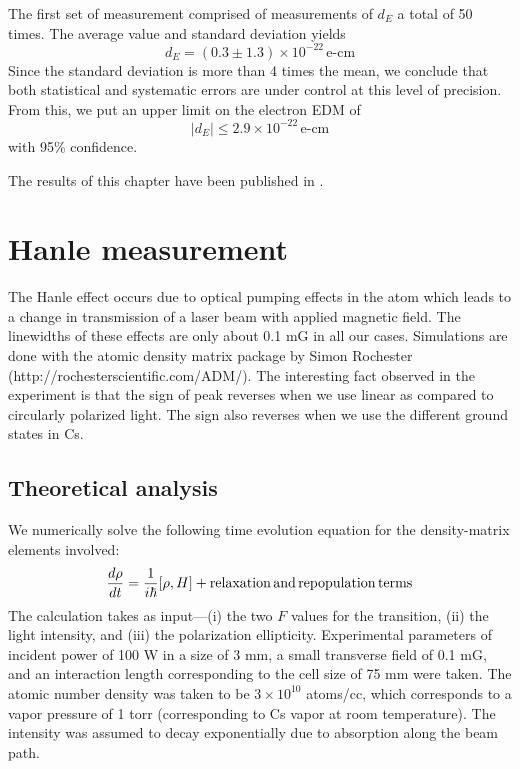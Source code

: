 The first set of measurement comprised of measurements of $ d_E $ a total of 50 times. The average value and standard deviation yields
\begin{equation}
d_E = (0.3 \pm 1.3) \times 10^{-22} \, \text{e-cm}
\end{equation}
Since the standard deviation is more than 4 times the mean, we conclude that both statistical and systematic errors are under control at this level of precision. From this, we put an upper limit on the electron EDM of 
\begin{equation*}
\lvert d_E \rvert \leq 2.9 \times 10^{-22} \, \text{e-cm}
\end{equation*}
with 95\% confidence. 

The results of this chapter have been published in \cite{HMA16}.




\chapter{Hanle measurement}


The Hanle effect occurs due to optical pumping effects in the atom which leads to a change in transmission of a laser beam with applied magnetic field. The linewidths of these effects are only about 0.1 mG in all our cases. Simulations are done with the atomic density matrix package by Simon Rochester (http://rochesterscientific.com/ADM/). The interesting fact observed in the experiment is that the sign of peak reverses when we use linear as compared to circularly polarized light. The sign also reverses when we use the different ground states in Cs.


\section{Theoretical analysis}
We numerically solve the following time evolution equation for the density-matrix elements involved:
\begin{equation}
\frac{d\rho}{dt} = \frac{1}{i\hbar}[\rho,H] + \rm{relaxation \, and \, repopulation \, terms}
\end{equation}
The calculation takes as input---(i) the two $ F $ values for the transition, (ii) the light intensity, and (iii) the polarization ellipticity. Experimental parameters of incident power of 100 \textmu W in a size of 3 mm, a small transverse field of 0.1 mG, and an interaction length corresponding to the cell size of 75 mm were taken. The atomic number density was taken to be $ 3 \times 10^{10} $ atoms/cc, which corresponds to a vapor pressure of 1 \textmu torr (corresponding to Cs vapor at room temperature). The intensity was assumed to decay exponentially due to absorption along the beam path. 

